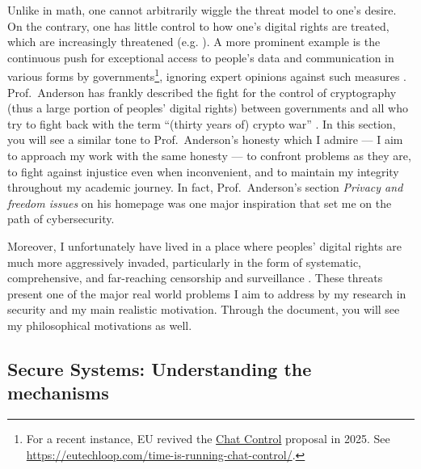 \documentclass[10pt]{article}
\begin{document}
Unlike in math, one cannot arbitrarily wiggle the threat model to one's desire.
On the contrary, one has little control to how one's digital rights are
treated, which are increasingly threatened (e.g. \cite{eu.digital.1,
eu.digital.2, internet.shutdown.2024}). A more prominent example is the
continuous push for exceptional access to people's data and communication in
various forms by governments\footnote{ For a recent instance, EU revived the
\href{
https://eur-lex.europa.eu/legal-content/EN/TXT/?uri=COM\%3A2022\%3A209\%3AFIN}
{Chat Control} proposal in 2025. See \url{
https://eutechloop.com/time-is-running-chat-control/}.}, ignoring expert
opinions against such measures \cite{keys.under.doormats, bugs.in.our.pockets,
chatcontrolchildprotection}. Prof.~Anderson has frankly described the fight for
the control of cryptography (thus a large portion of peoples' digital rights)
between governments and all who try to fight back with the term ``(thirty years
of) crypto war'' \cite{anderson.freedom}. In this section, you will see a
similar tone to Prof.~Anderson's honesty which I admire --- I aim to approach
my work with the same honesty --- to confront problems as they are, to fight
against injustice even when inconvenient, and to maintain my integrity
throughout my academic journey.  In fact, Prof.~Anderson's section
\emph{Privacy and freedom issues} \cite{anderson.freedom} on his homepage was
one major inspiration that set me on the path of cybersecurity.

Moreover, I unfortunately have lived in a place where
peoples' digital rights are much more aggressively invaded, particularly in the
form of systematic, comprehensive, and far-reaching censorship and surveillance
\cite{internet.coup} \cite[Sect.~5]{chall.censor.circum}.  These threats
present one of the major real world problems I aim to address by my research in
security and my main realistic motivation. Through the document, you will see
my philosophical motivations as well.

\subsection[Secure Systems]{
Secure Systems: Understanding the mechanisms} 
\label{sec.secure.systems}
\end{document}

